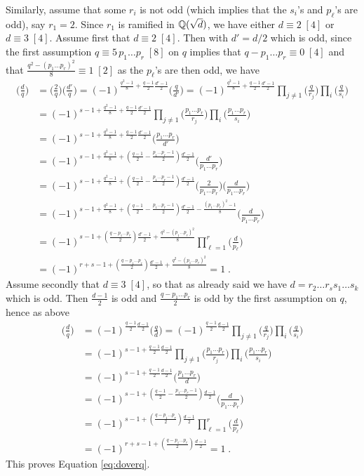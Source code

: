 \documentclass[11pt]{article}
\begin{document}
Similarly, assume that some $r_i$ is not odd (which implies that the
$s_i$'s and $p_\ell$'s are odd), say $r_1=2$. Since $r_1$ is ramified
in ${\mathbb Q}(\sqrt{d})$, we have either $d\equiv 2\;[4]$ or $d\equiv
3\;[4]$. Assume first that $d\equiv 2\;[4]$. Then with $d'=d/2$ which
is odd, since the first assumption $q\equiv 5\,p_1\dots p_r\;[8]$ on
$q$ implies that $q- p_1\dots p_r\equiv 0\;[4]$ and that $\frac{q^2-
  (p_1\dots p_r)^2}8 \equiv 1\;[2]$ as the $p_\ell$'s are then odd, we
have
\begin{align*}
\big(\frac{d}{q}\big)&=\big(\frac{2}{q}\big)\big(\frac{d'}{q}\big)
=(-1)^{\frac{q^2-1}{8}+\frac{q-1}2\frac{d'-1}2}
\big(\frac{q}{d'}\big)=(-1)^{\frac{q^2-1}{8}+\frac{q-1}2\frac{d'-1}2}
\prod_{j\neq 1}\big(\frac{q}{r_j}\big)\prod_{i}
\big(\frac{q}{s_i}\big)\\ &=(-1)^{s-1+\frac{q^2-1}{8}+\frac{q-1}2\frac{d'-1}2}
\prod_{j\neq 1}\big(\frac{p_1\dots p_r}{r_j}\big)\prod_{i}
\big(\frac{p_1\dots p_r}{s_i}\big)\\ &=
(-1)^{s-1+\frac{q^2-1}{8}+\frac{q-1}2\frac{d'-1}2}
\big(\frac{p_1\dots p_r}{d'}\big)\\ &=
(-1)^{s-1+\frac{q^2-1}{8}+(\frac{q-1}2-\frac{p_1\dots p_r-1}2)\frac{d'-1}2}
\big(\frac{d'}{p_1\dots p_r}\big)\\&=
(-1)^{s-1+\frac{q^2-1}{8}+(\frac{q-1}2-\frac{p_1\dots p_r-1}2)\frac{d'-1}2}
\big(\frac{2}{p_1\dots p_r}\big)\big(\frac{d}{p_1\dots p_r}\big)\\&=
(-1)^{s-1+\frac{q^2-1}{8}+(\frac{q-1}2-\frac{p_1\dots p_r-1}2)\frac{d'-1}2-
\frac{(p_1\dots p_r)^2-1}{8}} \big(\frac{d}{p_1\dots p_r}\big)\\&=
(-1)^{s-1+(\frac{q-p_1\dots p_r}2)\frac{d'-1}2+\frac{q^2-(p_1\dots p_r)^2}{8}}
\prod_{\ell=1}^r\big(\frac{d}{p_\ell}\big)\\&=
(-1)^{r+s-1+(\frac{q-p_1\dots p_r}2)\frac{d'-1}2+\frac{q^2-(p_1\dots p_r)^2}{8}}=1\;.
\end{align*}
Assume secondly that $d\equiv 3\;[4]$, so that as already said we have
$d=r_2\dots r_ss_1\dots s_k$ which is odd. Then $\frac{d-1}2$ is odd
and $\frac{q-p_1\dots p_r}2$ is odd by the first assumption on $q$,
hence as above
\begin{align*}
\big(\frac{d}{q}\big)&=(-1)^{\frac{q-1}2\frac{d-1}2}
\big(\frac{q}{d}\big)=(-1)^{\frac{q-1}2\frac{d-1}2}
\prod_{j\neq 1}\big(\frac{q}{r_j}\big)\prod_{i}
\big(\frac{q}{s_i}\big)\\ &=(-1)^{s-1+\frac{q-1}2\frac{d-1}2}
\prod_{j\neq 1}\big(\frac{p_1\dots p_r}{r_j}\big)\prod_{i}
\big(\frac{p_1\dots p_r}{s_i}\big)\\ &=
(-1)^{s-1+\frac{q-1}2\frac{d-1}2}
\big(\frac{p_1\dots p_r}{d}\big)\\ &=
(-1)^{s-1+(\frac{q-1}2-\frac{p_1\dots p_r-1}2)\frac{d-1}2}
\big(\frac{d}{p_1\dots p_r}\big)\\&=
(-1)^{s-1+(\frac{q-p_1\dots p_r}2)\frac{d-1}2}
\prod_{\ell=1}^r\big(\frac{d}{p_\ell}\big)\\&=
(-1)^{r+s-1+(\frac{q-p_1\dots p_r}2)\frac{d-1}2}=1\;.
\end{align*}
This proves Equation \eqref{eq:doverq}.
\end{document}
